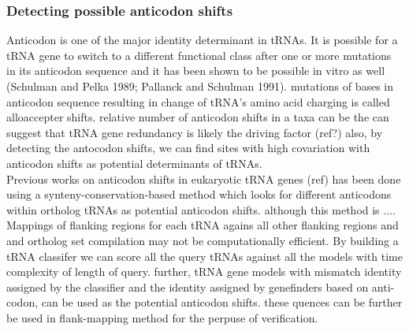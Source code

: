 \documentclass[
10pt, %
a4paper, %
oneside, %
headinclude,footinclude, %
BCOR5mm, %
]{scrartcl}
\begin{document}

\subsubsection*{Detecting possible anticodon shifts}
Anticodon is one of the major identity determinant in tRNAs. It is possible for a tRNA gene to switch to a different functional class after one or more mutations in its anticodon sequence and it has been shown to be possible in vitro as well (Schulman and Pelka 1989; Pallanck and Schulman 1991). mutations of bases in anticodon sequence resulting in change of tRNA’s amino acid charging is called alloaccepter shifts. relative number of anticodon shifts in a taxa can be the can suggest that tRNA gene redundancy is likely the driving factor (ref?)
also, by detecting the antocodon shifts, we can find sites with high covariation with anticodon shifts as potential determinants of tRNAs.\\ 
Previous works on anticodon shifts in eukaryotic tRNA genes (ref) has been done using a synteny-conservation-based method which looks for different anticodons within ortholog tRNAs as potential anticodon shifts. although this method is .... Mappings of flanking regions for each tRNA agains all other flanking regions and and ortholog set compilation may not be computationally efficient. By building a tRNA classifer we can score all the query tRNAs against all the models with time complexity of length of query. further, tRNA gene models with mismatch identity assigned by the classifier and the identity assigned by genefinders based on anti-codon, can be used as the potential anticodon shifts. these quences can be further be used in flank-mapping method for the perpuse of verification. 
\end{document}
